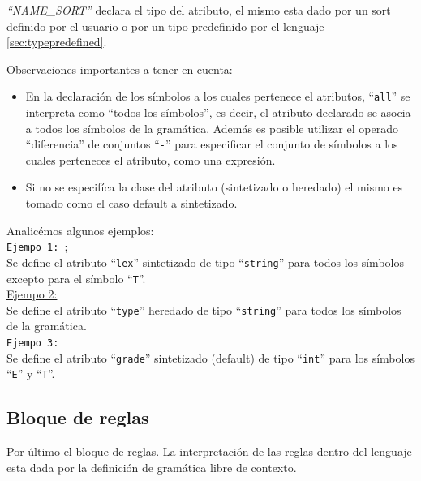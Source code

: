 \textit{``NAME\_SORT''} declara el tipo del atributo, el mismo esta dado por un sort definido por el usuario o por un tipo predefinido por el lenguaje \ref{sec:typepredefined}.

Observaciones importantes a tener en cuenta:

\begin{itemize}
\item En la declaración de los símbolos a los cuales pertenece el atributos, ``\texttt{all}'' se interpreta como ``todos los símbolos'', es decir, el atributo declarado se asocia a todos los símbolos de la gramática. Además es posible utilizar el operado ``diferencia'' de conjuntos ``\texttt{-}'' para especificar el conjunto de símbolos a los cuales perteneces el atributo, como una expresión.

\item Si no se especifíca la clase del atributo (sintetizado o heredado) el mismo es tomado como el caso default a sintetizado.
\end{itemize}

Analicémos algunos ejemplos:\\

\texttt{Ejempo 1:}\ ;\\
\vspace{0.2cm}
Se define el atributo ``\texttt{lex}'' sintetizado de tipo ``\texttt{string}'' para todos los símbolos excepto para el símbolo ``\texttt{T}''.\\

\underline{Ejempo 2:}\ \\
\vspace{0.2cm}
Se define el atributo ``\texttt{type}'' heredado de tipo ``\texttt{string}'' para todos los símbolos de la gramática.\\

\texttt{Ejempo 3:}\ \\
\vspace{0.2cm}
Se define el atributo ``\texttt{grade}'' sintetizado (default) de tipo ``\texttt{int}'' para los símbolos ``\texttt{E}'' y ``\texttt{T}''.\\

\subsection{Bloque de reglas}
Por último el bloque de reglas. La interpretación de las reglas dentro del lenguaje esta dada por la definición de gramática libre de contexto.          

